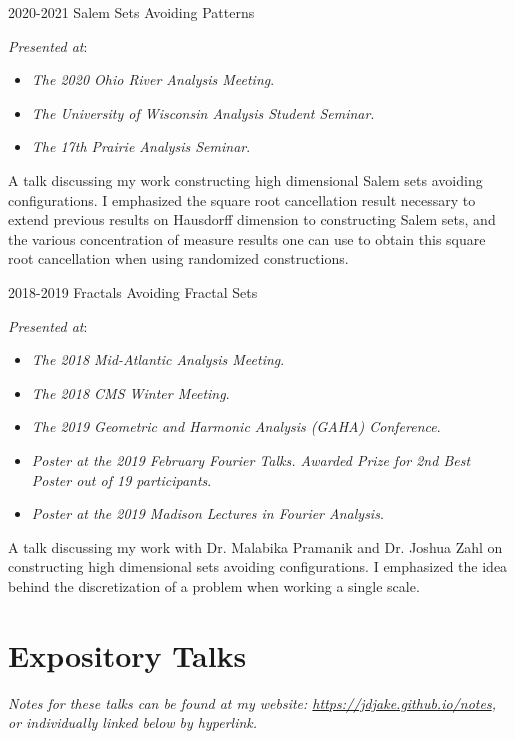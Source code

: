 \documentclass[a4paper]{cv-friggeri}
\begin{document}
\begin{entrylist}

\entry
{2020-2021}
{Salem Sets Avoiding Patterns}
{}
{\emph{Presented at}:
%
\begin{itemize}
	\item \emph{The 2020 Ohio River Analysis Meeting}.
	\item \emph{The University of Wisconsin Analysis Student Seminar}.
	\item \emph{The 17th Prairie Analysis Seminar}.
\end{itemize}
%
A talk discussing my work constructing high dimensional Salem sets avoiding configurations. I emphasized the square root cancellation result necessary to extend previous results on Hausdorff dimension to constructing Salem sets, and the various concentration of measure results one can use to obtain this square root cancellation when using randomized constructions.}

\entry
{2018-2019}
{Fractals Avoiding Fractal Sets}
{}
{\emph{Presented at}:
%
\begin{itemize}
	\item \emph{The 2018 Mid-Atlantic Analysis Meeting}.
	\item \emph{The 2018 CMS Winter Meeting}.
	\item \emph{The 2019 Geometric and Harmonic Analysis (GAHA) Conference}.
	\item \emph{Poster at the 2019 February Fourier Talks. Awarded Prize for 2nd Best Poster out of 19 participants}.
	\item \emph{Poster at the 2019 Madison Lectures in Fourier Analysis}.
\end{itemize}
%
A talk discussing my work with Dr. Malabika Pramanik and Dr. Joshua Zahl on constructing high dimensional sets avoiding configurations. I emphasized the idea behind the discretization of a problem when working a single scale.}

\end{entrylist}

\section{Expository Talks}

\emph{Notes for these talks can be found at my website: \href{https://jdjake.github.io/notes}{https://jdjake.github.io/notes}, or individually linked below by hyperlink.}
\end{document}
